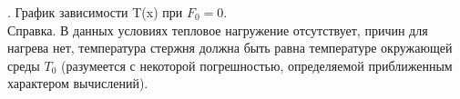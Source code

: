 \documentclass[14pt, a4paper]{extarticle}
\begin{document}
\begin{figure}[h!]	
\end{figure}\par

. График зависимости T(x) при $F_0=0$.\\
Справка. В данных условиях тепловое нагружение отсутствует, причин для нагрева нет, температура стержня должна быть равна температуре окружающей среды $T_0$ (разумеется с некоторой погрешностью, определяемой приближенным характером вычислений).  

\begin{figure}[h!]	
\end{figure}\par
\end{document}
